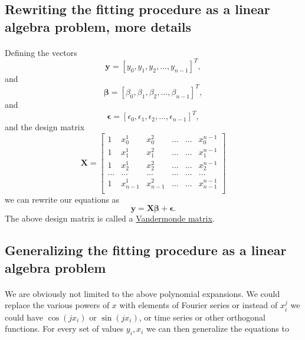 \documentclass[%
oneside,                 %
final,                   %
10pt]{article}
\begin{document}
\subsection*{Rewriting the fitting procedure as a linear algebra problem, more details}

\paragraph{}
Defining the vectors
\[
\bm{y} = [y_0,y_1, y_2,\dots, y_{n-1}]^T,
\]
and
\[
\bm{\beta} = [\beta_0,\beta_1, \beta_2,\dots, \beta_{n-1}]^T,
\]
and
\[
\bm{\epsilon} = [\epsilon_0,\epsilon_1, \epsilon_2,\dots, \epsilon_{n-1}]^T,
\]
and the design matrix
\[
\bm{X}=
\begin{bmatrix} 
1& x_{0}^1 &x_{0}^2& \dots & \dots &x_{0}^{n-1}\\
1& x_{1}^1 &x_{1}^2& \dots & \dots &x_{1}^{n-1}\\
1& x_{2}^1 &x_{2}^2& \dots & \dots &x_{2}^{n-1}\\                      
\dots& \dots &\dots& \dots & \dots &\dots\\
1& x_{n-1}^1 &x_{n-1}^2& \dots & \dots &x_{n-1}^{n-1}\\
\end{bmatrix} 
\]
we can rewrite our equations as
\[
\bm{y} = \bm{X}\bm{\beta}+\bm{\epsilon}.
\]
The above design matrix is called a \href{{https://en.wikipedia.org/wiki/Vandermonde_matrix}}{Vandermonde matrix}.




\subsection*{Generalizing the fitting procedure as a linear algebra problem}

\paragraph{}

We are obviously not limited to the above polynomial expansions.  We
could replace the various powers of $x$ with elements of Fourier
series or instead of $x_i^j$ we could have $\cos{(j x_i)}$ or $\sin{(j
x_i)}$, or time series or other orthogonal functions.  For every set
of values $y_i,x_i$ we can then generalize the equations to
\end{document}
